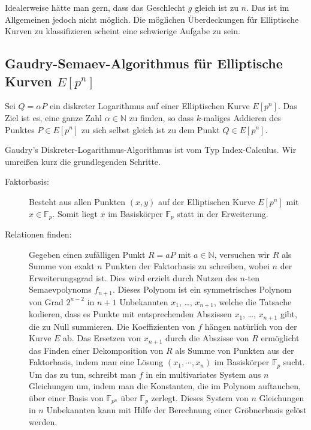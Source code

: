 \begin{refsegment}
Idealerweise hätte man gern, dass das Geschlecht $g$ gleich ist zu $n$. Das ist im Allgemeinen jedoch nicht möglich. Die möglichen Überdeckungen für Elliptische Kurven zu klassifizieren scheint eine schwierige Aufgabe zu sein.


\subsection{\texorpdfstring{Gaudry-Semaev-Algorithmus für Elliptische Kurven $E[p^n]$}{Gaudry-Semaev-Algorithmus für Elliptische Kurven E[pn]}}
\label{gaudry}

Sei $Q=\alpha P$ ein diskreter Logarithmus auf einer Elliptischen Kurve $E[p^n]$. Das Ziel ist es, eine ganze Zahl $\alpha \in \mathbb{N}$ zu finden, so dass $k$-maliges Addieren des Punktes $P \in E[p^n]$ zu sich selbst gleich ist zu dem Punkt $Q \in E[p^n]$.

Gaudry's Diskreter-Logarithmus-Algorithmus ist vom Typ Index-Calculus. Wir umreißen kurz die grundlegenden Schritte.

\begin{description}
\item[Faktorbasis:] Besteht aus allen Punkten $(x,y)$ auf der Elliptischen Kurve $E[p^n]$ mit $x\in \mathbb{F}_p$. Somit liegt $x$ im Basiskörper $\mathbb{F}_p$ statt in der Erweiterung.

\item[Relationen finden:] Gegeben einen zufälligen Punkt $R = aP$ mit $a\in
  \mathbb{N}$, versuchen wir $R$ als Summe von exakt $n$ Punkten der Faktorbasis zu schreiben, wobei $n$ der Erweiterungsgrad ist. Dies wird erzielt durch Nutzen des $n$-ten Semaevpolynoms $f_{n+1}$. Dieses Polynom ist ein symmetrisches Polynom von Grad $2^{n-2}$ in $n+1$ Unbekannten $x_1$,
  \dots, $x_{n+1}$, welche die Tatsache kodieren, dass es Punkte mit entsprechenden Abszissen $x_1$, \dots, $x_{n+1}$ gibt, die zu Null summieren. Die Koeffizienten von $f$ hängen natürlich von der Kurve $E$ ab. Das Ersetzen von $x_{n+1}$ durch die Abszisse von $R$ ermöglicht das Finden einer Dekomposition von $R$ als Summe von Punkten aus der Faktorbasis, indem man eine Lösung $(x_1,\cdots, x_n)$ im Basiskörper $\mathbb{F}_p$ sucht. Um das zu tun, schreibt man $f$ in ein multivariates System aus $n$ Gleichungen um, indem man die Konstanten, die im Polynom auftauchen, über einer Basis von $\mathbb{F}_{p^n}$ über $\mathbb{F}_p$ zerlegt. Dieses System von $n$ Gleichungen in $n$ Unbekannten kann mit Hilfe der Berechnung einer Gröbnerbasis gelöst werden.


\end{description}
\end{refsegment}
